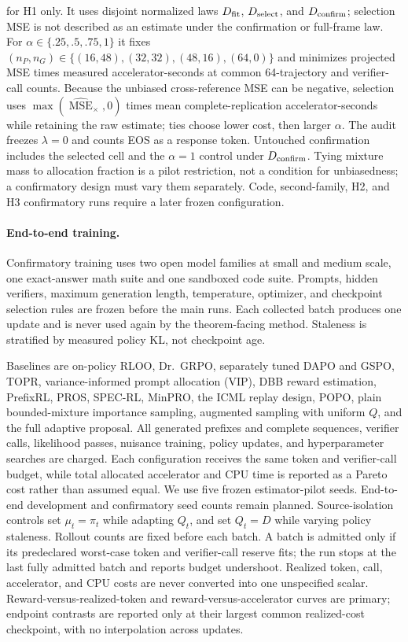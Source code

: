 \documentclass{article}
\begin{document}
for H1 only. It uses disjoint normalized laws $D_{\rm fit}$,
$D_{\rm select}$, and $D_{\rm confirm}$; selection MSE is not described as an
estimate under the confirmation or full-frame law. For
$\alpha\in\{.25,.5,.75,1\}$ it fixes
$(n_P,n_G)\in\{(16,48),(32,32),(48,16),(64,0)\}$ and minimizes projected MSE
times measured accelerator-seconds at common 64-trajectory and verifier-call
counts. Because the unbiased cross-reference MSE can be negative, selection
uses $\max(\widehat{\operatorname{MSE}}_\times,0)$ times mean
complete-replication accelerator-seconds while retaining the raw estimate;
ties choose lower cost, then larger $\alpha$. The audit freezes $\lambda=0$
and counts EOS as a response token. Untouched confirmation includes the
selected cell and the $\alpha=1$ control under $D_{\rm confirm}$.
Tying mixture mass to allocation fraction is a pilot restriction, not
a condition for unbiasedness; a confirmatory design must vary them separately.
Code, second-family, H2, and H3
confirmatory runs require a later frozen configuration.

\paragraph{End-to-end training.}
Confirmatory training uses two open model families at small and medium scale,
one exact-answer math suite and one sandboxed code suite. Prompts, hidden
verifiers, maximum generation length, temperature, optimizer, and checkpoint
selection rules are frozen before the main runs. Each collected batch produces
one update and is never used again by the theorem-facing method. Staleness is
stratified by measured policy KL, not checkpoint age.

Baselines are on-policy RLOO, Dr.\ GRPO, separately tuned DAPO and GSPO, TOPR,
variance-informed prompt allocation (VIP), DBB reward estimation,
PrefixRL, PROS, SPEC-RL, MinPRO,
the ICML replay design, POPO,
plain bounded-mixture importance sampling, augmented sampling with uniform
$Q$, and the full adaptive proposal. All generated prefixes and complete
sequences, verifier calls, likelihood passes, nuisance training, policy
updates, and hyperparameter searches are charged. Each configuration receives
the same token and verifier-call budget, while total allocated accelerator and
CPU time is reported as a Pareto cost rather than assumed equal. We use five
frozen estimator-pilot seeds. End-to-end development and confirmatory seed
counts remain planned.
Source-isolation controls set $\mu_t=\pi_t$ while adapting $Q_t$, and set
$Q_t=D$ while varying policy staleness. Rollout counts are fixed before each
batch. A batch is admitted only if its predeclared worst-case token and
verifier-call reserve fits; the run stops at the last fully admitted batch and
reports budget undershoot. Realized token, call, accelerator, and CPU costs are
never converted into one unspecified scalar. Reward-versus-realized-token and
reward-versus-accelerator curves are primary; endpoint contrasts are reported
only at their largest common realized-cost checkpoint, with no interpolation
across updates.
\end{document}

